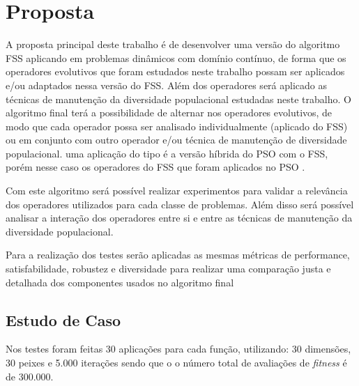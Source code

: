 \chapter{Proposta}
\label{ch:proposta}

A proposta principal deste trabalho é de desenvolver uma versão do algoritmo FSS aplicando em problemas dinâmicos com domínio contínuo, de forma que os operadores evolutivos que foram estudados neste trabalho possam ser aplicados e/ou adaptados nessa versão do FSS. Além dos operadores será aplicado as técnicas de manutenção da diversidade populacional estudadas neste trabalho. O algoritmo final terá a possibilidade de alternar nos operadores evolutivos, de modo que cada operador possa ser analisado individualmente (aplicado do FSS) ou em conjunto com outro operador e/ou técnica de manutenção de diversidade populacional. uma aplicação do tipo é a versão híbrida do PSO com o FSS, porém nesse caso os operadores do FSS que foram aplicados no PSO \cite{cavalcanti2011hybrid}.

Com este algoritmo será possível realizar experimentos para validar a relevância dos operadores utilizados para cada classe de problemas. Além disso será possível analisar a interação dos operadores entre si e entre as técnicas de manutenção da diversidade populacional.

Para a realização dos testes serão aplicadas as mesmas métricas de performance, satisfabilidade, robustez e diversidade para realizar uma comparação justa e detalhada dos componentes usados no algoritmo final

\section{Estudo de Caso}
\label{sec:test_case}

Nos testes foram feitas 30 aplicações para cada função, utilizando: 30 dimensões, 30 peixes e 5.000 iterações sendo que o o número total de avaliações de \textit{fitness} é de 300.000.


